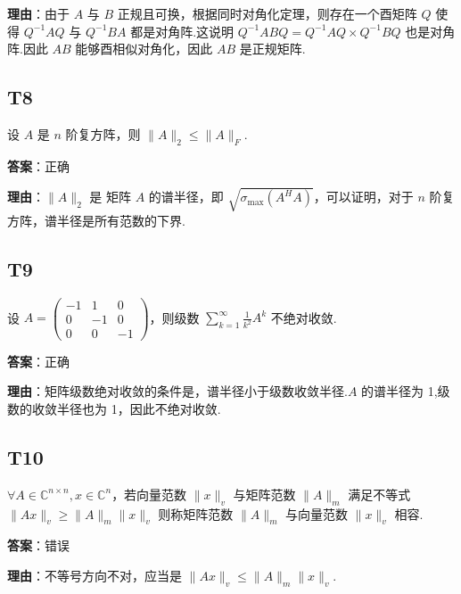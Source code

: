 \documentclass{article}
\begin{document}
\par \textbf{理由}：由于 $A$ 与 $B$ 正规且可换，根据同时对角化定理，则存在一个酉矩阵 $Q$ 使得 $Q^{-1}AQ$ 与 $Q^{-1}BA$ 都是对角阵.这说明 $Q^{-1}ABQ = Q^{-1}AQ\times Q^{-1}BQ$ 也是对角阵.因此 $AB$ 能够酉相似对角化，因此 $AB$ 是正规矩阵.

\subsection{T8}

\par 设 $A$ 是 $n$ 阶复方阵，则 $\|A\|_2\leq \|A\|_F$.

\par \textbf{答案}：正确

\par \textbf{理由}：$\|A\|_2$ 是 矩阵 $A$ 的谱半径，即 $\sqrt{\sigma_{\text{max}}(A^HA)}$，可以证明，对于 $n$ 阶复方阵，谱半径是所有范数的下界.

\subsection{T9}

\par 设 $A=\begin{pmatrix}-1 & 1 & 0\\0 & -1 & 0\\0 & 0 &-1\end{pmatrix}$，则级数 $\sum_{k=1}^{\infty}\frac{1}{k^2}A^k$ 不绝对收敛.

\par \textbf{答案}：正确

\par \textbf{理由}：矩阵级数绝对收敛的条件是，谱半径小于级数收敛半径.$A$ 的谱半径为 1,级数的收敛半径也为 1，因此不绝对收敛.

\subsection{T10}

\par $\forall A\in \mathbb C^{n\times n}, x\in \mathbb C^n$，若向量范数 $\|x\|_v$ 与矩阵范数 $\|A\|_m$ 满足不等式 $\|Ax\|_v\geq \|A\|_m \|x\|_v$ 则称矩阵范数 $\|A\|_m$ 与向量范数 $\|x\|_v$ 相容.

\par \textbf{答案}：错误

\par \textbf{理由}：不等号方向不对，应当是 $\|Ax\|_v\leq \|A\|_m \|x\|_v$.
\end{document}
